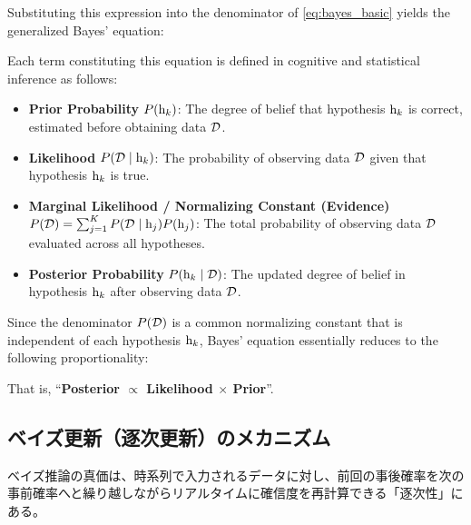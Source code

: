     Substituting this expression into the denominator of \eqref{eq:bayes_basic} yields the generalized Bayes' equation:

    

    Each term constituting this equation is defined in cognitive and statistical inference as follows:

    \begin{itemize}
        \item \textbf{Prior Probability} $P( \mathrm{h}_{k} )$: The degree of belief that hypothesis $\mathrm{h}_{k}$ is correct, estimated before obtaining data $\mathcal{D}$.
        \item \textbf{Likelihood} $P( \mathcal{D} \mid \mathrm{h}_{k} )$: The probability of observing data $\mathcal{D}$ given that hypothesis $\mathrm{h}_{k}$ is true.
        \item \textbf{Marginal Likelihood / Normalizing Constant (Evidence)} $P( \mathcal{D} ) = \sum_{j=1}^{K} P( \mathcal{D} \mid \mathrm{h}_{j} ) P( \mathrm{h}_{j} )$: The total probability of observing data $\mathcal{D}$ evaluated across all hypotheses.
        \item \textbf{Posterior Probability} $P( \mathrm{h}_{k} \mid \mathcal{D} )$: The updated degree of belief in hypothesis $\mathrm{h}_{k}$ after observing data $\mathcal{D}$.
    \end{itemize}

    Since the denominator $P( \mathcal{D} )$ is a common normalizing constant that is independent of each hypothesis $\mathrm{h}_{k}$, Bayes' equation essentially reduces to the following proportionality:

    

    That is, ``\textbf{Posterior $\propto$ Likelihood $\times$ Prior}''.
\fi

\ifja
\subsection{ベイズ更新（逐次更新）のメカニズム}
ベイズ推論の真価は、時系列で入力されるデータに対し、前回の事後確率を次の事前確率へと繰り越しながらリアルタイムに確信度を再計算できる「逐次性」にある。

